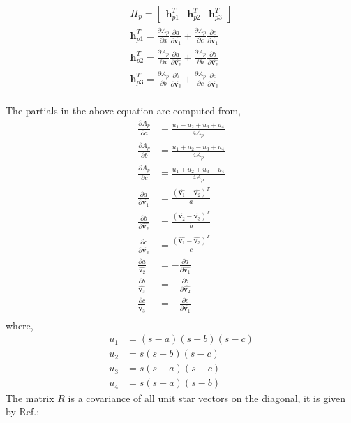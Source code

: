 \documentclass[]{aiaa-tc}%
\begin{document}
\begin{subequations}
\begin{align}
H_p =
\begin{bmatrix}
\textbf{h}_{p1}^{T} & \textbf{h}_{p2}^{T} & \textbf{h}_{p3}^{T}
\end{bmatrix} \\
\textbf{h}_{p1}^{T} = \frac{\partial A_p}{\partial a}\frac{\partial a}{\partial \hat{\textbf{v}_1}} + \frac{\partial A_p}{\partial c}\frac{\partial c}{\partial \hat{\textbf{v}_1}}\\
\textbf{h}_{p2}^{T} = \frac{\partial A_p}{\partial a}\frac{\partial a}{\partial \hat{\textbf{v}_2}} + \frac{\partial A_p}{\partial b}\frac{\partial b}{\partial \hat{\textbf{v}_2}}\\
\textbf{h}_{p3}^{T} = \frac{\partial A_p}{\partial b}\frac{\partial b}{\partial \hat{\textbf{v}_3}} + \frac{\partial A_p}{\partial c}\frac{\partial c}{\partial \hat{\textbf{v}_3}}\\
\end{align}
\end{subequations}

The partials in the above equation are computed from,
\begin{subequations}
\begin{align}
\frac{\partial A_p}{\partial a} &= \frac{u_1-u_2+u_3+u_4}{4A_p}\\
\frac{\partial A_p}{\partial b} &= \frac{u_1+u_2-u_3+u_4}{4A_p}\\
\frac{\partial A_p}{\partial c} &= \frac{u_1+u_2+u_3-u_4}{4A_p}\\
\frac{\partial a}{\partial \hat{\textbf{v}_1}} &= \frac{(\hat{\textbf{v}_1}- {\hat{\textbf{v}_2}})^T}{a}\\
\frac{\partial b}{\partial \hat{\textbf{v}_2}}&= \frac{(\hat{\textbf{v}_2}- {\hat{\textbf{v}_3}})^T}{b}\\
\frac{\partial c}{\partial \hat{\textbf{v}_3}} &= \frac{(\hat{\textbf{v}_1}- {\hat{\textbf{v}_3}})^T}{c}\\
\frac{\partial a}{\hat{\textbf{v}_2}} &= - \frac{\partial a}{\partial \hat{\textbf{v}_1}}\\
\frac{\partial b}{\hat{\textbf{v}_3}} &= - \frac{\partial b}{\partial \hat{\textbf{v}_2}}\\
\frac{\partial c}{\hat{\textbf{v}_3}} &= - \frac{\partial c}{\partial \hat{\textbf{v}_1}}\\
\end{align}
\end{subequations}
where,
\begin{subequations}
\begin{align}
u_1 &= (s-a)(s-b)(s-c)\\
u_2 &= s(s-b)(s-c)\\
u_3 &= s(s-a)(s-c)\\
u_4 &= s(s-a)(s-b)
\end{align}
\end{subequations}
The matrix $R$ is a covariance of all unit star vectors on the diagonal, it is given by Ref.:
\end{document}
